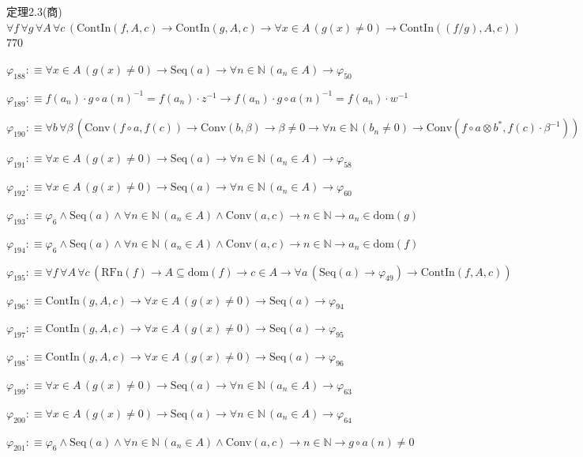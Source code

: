 \begin{fullproof}{定理2.3(商)}{$\forall f\,\forall g\,\forall A\,\forall c\,(\mathrm{ContIn}(f,A,c) \to \mathrm{ContIn}(g,A,c) \to \forall x \in A\,(g(x) \neq 0) \to \mathrm{ContIn}((f / g),A,c))$}{770}
\begin{abbrevlist}
\item $\varphi_{188} :\equiv \forall x \in A\,(g(x) \neq 0) \to \mathrm{Seq}(a) \to \forall n \in \mathbb{N}\,(a_{n} \in A) \to \varphi_{50}$
\item $\varphi_{189} :\equiv f(a_{n}) \cdot g \circ a(n)^{-1} = f(a_{n}) \cdot z^{-1} \to f(a_{n}) \cdot g \circ a(n)^{-1} = f(a_{n}) \cdot w^{-1}$
\item $\varphi_{190} :\equiv \forall b\,\forall \beta\,(\mathrm{Conv}(f \circ a,f(c)) \to \mathrm{Conv}(b,\beta) \to \beta \neq 0 \to \forall n \in \mathbb{N}\,(b_{n} \neq 0) \to \mathrm{Conv}(f \circ a \otimes b^{\ast},f(c) \cdot \beta^{-1}))$
\item $\varphi_{191} :\equiv \forall x \in A\,(g(x) \neq 0) \to \mathrm{Seq}(a) \to \forall n \in \mathbb{N}\,(a_{n} \in A) \to \varphi_{58}$
\item $\varphi_{192} :\equiv \forall x \in A\,(g(x) \neq 0) \to \mathrm{Seq}(a) \to \forall n \in \mathbb{N}\,(a_{n} \in A) \to \varphi_{60}$
\item $\varphi_{193} :\equiv \varphi_{6} \land \mathrm{Seq}(a) \land \forall n \in \mathbb{N}\,(a_{n} \in A) \land \mathrm{Conv}(a,c) \to n \in \mathbb{N} \to a_{n} \in \mathrm{dom}(g)$
\item $\varphi_{194} :\equiv \varphi_{6} \land \mathrm{Seq}(a) \land \forall n \in \mathbb{N}\,(a_{n} \in A) \land \mathrm{Conv}(a,c) \to n \in \mathbb{N} \to a_{n} \in \mathrm{dom}(f)$
\item $\varphi_{195} :\equiv \forall f\,\forall A\,\forall c\,(\mathrm{RFn}(f) \to A \subseteq \mathrm{dom}(f) \to c \in A \to \forall a\,(\mathrm{Seq}(a) \to \varphi_{49}) \to \mathrm{ContIn}(f,A,c))$
\item $\varphi_{196} :\equiv \mathrm{ContIn}(g,A,c) \to \forall x \in A\,(g(x) \neq 0) \to \mathrm{Seq}(a) \to \varphi_{94}$
\item $\varphi_{197} :\equiv \mathrm{ContIn}(g,A,c) \to \forall x \in A\,(g(x) \neq 0) \to \mathrm{Seq}(a) \to \varphi_{95}$
\item $\varphi_{198} :\equiv \mathrm{ContIn}(g,A,c) \to \forall x \in A\,(g(x) \neq 0) \to \mathrm{Seq}(a) \to \varphi_{96}$
\item $\varphi_{199} :\equiv \forall x \in A\,(g(x) \neq 0) \to \mathrm{Seq}(a) \to \forall n \in \mathbb{N}\,(a_{n} \in A) \to \varphi_{63}$
\item $\varphi_{200} :\equiv \forall x \in A\,(g(x) \neq 0) \to \mathrm{Seq}(a) \to \forall n \in \mathbb{N}\,(a_{n} \in A) \to \varphi_{64}$
\item $\varphi_{201} :\equiv \varphi_{6} \land \mathrm{Seq}(a) \land \forall n \in \mathbb{N}\,(a_{n} \in A) \land \mathrm{Conv}(a,c) \to n \in \mathbb{N} \to g \circ a(n) \neq 0$

\end{abbrevlist}
\end{fullproof}
